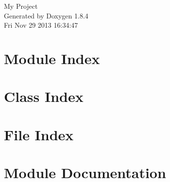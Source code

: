 \documentclass[twoside]{book}
\newcommand{\clearemptydoublepage}{%
  \newpage{\pagestyle{empty}\cleardoublepage}%
}
\begin{document}
\hypersetup{pageanchor=false}
\begin{titlepage}
\vspace*{7cm}
\begin{center}%
{\Large My Project }\\
\vspace*{1cm}
{\large Generated by Doxygen 1.8.4}\\
\vspace*{0.5cm}
{\small Fri Nov 29 2013 16:34:47}\\
\end{center}
\end{titlepage}
\clearemptydoublepage
\tableofcontents
\clearemptydoublepage
{}
\hypersetup{pageanchor=true}

\chapter{Module Index}

\chapter{Class Index}

\chapter{File Index}

\chapter{Module Documentation}


























\end{document}
